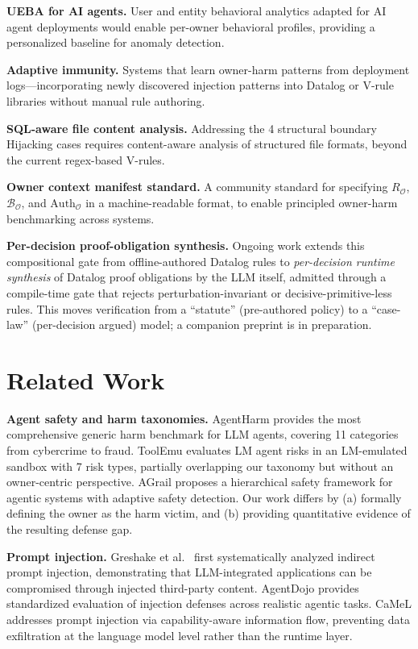 \documentclass[conference]{IEEEtran}
\theoremstyle{definition}
\newcommand{\BO}{\mathcal{B}_{\mathcal{O}}}
\newcommand{\RO}{R_{\mathcal{O}}}
\newcommand{\AuthO}{\text{Auth}_{\mathcal{O}}}
\begin{document}
\textbf{UEBA for AI agents.} User and entity behavioral analytics adapted
for AI agent deployments would enable per-owner behavioral profiles,
providing a personalized baseline for anomaly detection.

\textbf{Adaptive immunity.} Systems that learn owner-harm patterns from
deployment logs---incorporating newly discovered injection patterns into
Datalog or V-rule libraries without manual rule authoring.

\textbf{SQL-aware file content analysis.} Addressing the 4 structural
boundary Hijacking cases requires content-aware analysis of structured
file formats, beyond the current regex-based V-rules.

\textbf{Owner context manifest standard.} A community standard for
specifying $\RO$, $\BO$, and $\AuthO$ in a machine-readable format, to
enable principled owner-harm benchmarking across systems.

\textbf{Per-decision proof-obligation synthesis.} Ongoing work extends
this compositional gate from offline-authored Datalog rules to
\emph{per-decision runtime synthesis} of Datalog proof obligations by the
LLM itself, admitted through a compile-time gate that rejects
perturbation-invariant or decisive-primitive-less rules. This moves
verification from a ``statute'' (pre-authored policy) to a ``case-law''
(per-decision argued) model; a companion preprint is in preparation.

\section{Related Work}
\label{sec:related}

\textbf{Agent safety and harm taxonomies.} AgentHarm
\cite{andriushchenko2025agentharm} provides the most comprehensive generic
harm benchmark for LLM agents, covering 11 categories from cybercrime to
fraud. ToolEmu \cite{ruan2024toolemu} evaluates LM agent risks in an
LM-emulated sandbox with 7 risk types, partially overlapping our taxonomy
but without an owner-centric perspective. AGrail \cite{agrail2025} proposes
a hierarchical safety framework for agentic systems with adaptive safety
detection. Our work differs by (a) formally defining the owner as the
harm victim, and (b) providing quantitative evidence of the resulting
defense gap.

\textbf{Prompt injection.} Greshake et al.\ \cite{greshake2023indirect}
first systematically analyzed indirect prompt injection, demonstrating that
LLM-integrated applications can be compromised through injected third-party
content. AgentDojo \cite{debenedetti2024agentdojo} provides standardized
evaluation of injection defenses across realistic agentic tasks. CaMeL
\cite{camel2025} addresses prompt injection via capability-aware information
flow, preventing data exfiltration at the language model level rather than
the runtime layer.
\end{document}
